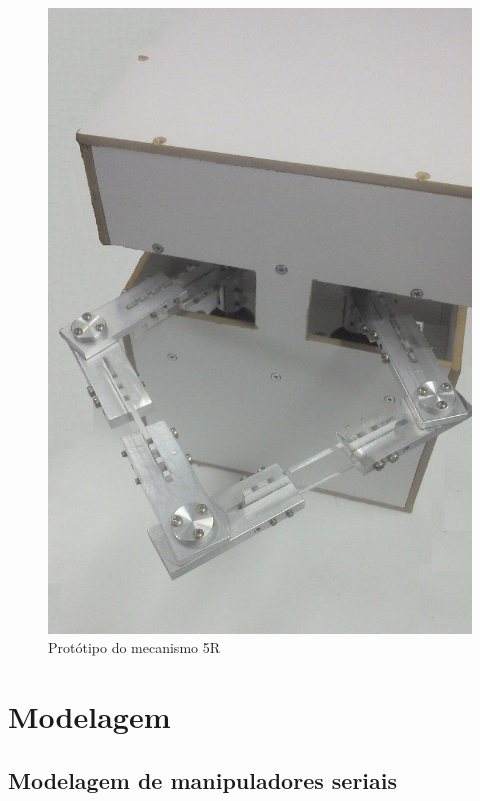 \documentclass[]{politex}
\begin{document}
\begin{figure}[h]
	\centering
	\includegraphics[scale=0.3]{../figures/Clara.jpg}  
	\caption{Protótipo do mecanismo 5R}
	\label{fig:Mecanismo2}
\end{figure}


\part{Modelagem}
	
\chapter{Modelagem de manipuladores seriais}
\end{document}
